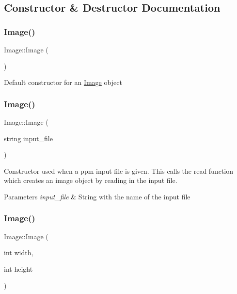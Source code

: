 \subsection{Constructor \& Destructor Documentation}
\mbox{\label{class_image_a58edd1c45b4faeb5f789b0d036d02313}} 
\subsubsection{\texorpdfstring{Image()}{Image()}\hspace{0.1cm}{\footnotesize\ttfamily [1/3]}}
{\footnotesize\ttfamily Image\+::\+Image (\begin{DoxyParamCaption}{ }\end{DoxyParamCaption})}

Default constructor for an \hyperlink{class_image}{Image} object \mbox{\label{class_image_af2d2b2b46060ce7d4dda966d1bb29b45}} 
\subsubsection{\texorpdfstring{Image()}{Image()}\hspace{0.1cm}{\footnotesize\ttfamily [2/3]}}
{\footnotesize\ttfamily Image\+::\+Image (\begin{DoxyParamCaption}\item[{string}]{input\+\_\+file }\end{DoxyParamCaption})}

Constructor used when a ppm input file is given. This calls the read function which creates an image object by reading in the input file.


\begin{DoxyParams}{Parameters}
{\em input\+\_\+file} & String with the name of the input file \\
\hline
\end{DoxyParams}
\mbox{\label{class_image_afb0339b802ed560e69eb07358d30198f}} 
\subsubsection{\texorpdfstring{Image()}{Image()}\hspace{0.1cm}{\footnotesize\ttfamily [3/3]}}
{\footnotesize\ttfamily Image\+::\+Image (\begin{DoxyParamCaption}\item[{int}]{width,  }\item[{int}]{height }\end{DoxyParamCaption})}

